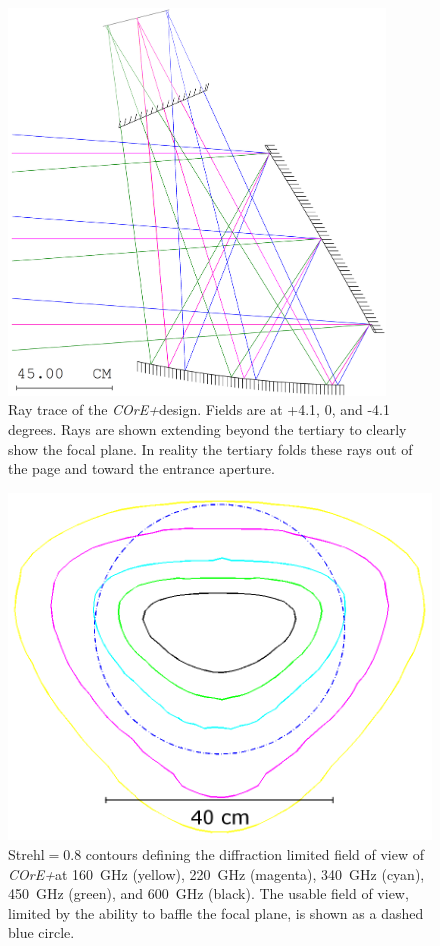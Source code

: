 \documentclass[11pt,a4paper]{article}
\newcommand{\coreplus}{\textit{\negthinspace COrE+\/}}
\begin{document}
\begin{figure}[htbp] %
	\centering
	\includegraphics[width=10cm]{xdragone_raytrace.png} 
	\caption{Ray trace of the \coreplus design. Fields are at +4.1, 0, and -4.1 degrees. Rays are shown extending beyond the tertiary 
		to clearly show the focal plane.  In reality the tertiary folds these rays out of the page and toward the entrance 
		aperture.  
	}
	\label{fig:raytrace_xdragone}
\end{figure}

\begin{figure}[htbp] %
	\centering
	\includegraphics[width=12cm]{core_xdragone_strehl.png} 
	\caption{Strehl$=0.8$ contours defining the diffraction limited field of view of \coreplus at 
                 160~GHz (yellow), 220~GHz (magenta), 340~GHz (cyan), 450~GHz (green), and 600~GHz (black). 
		The usable field of view, limited by the ability to baffle the focal plane, is shown as a 
                dashed blue circle.
		}
	\label{fig:strehl_xdragone}
\end{figure}
\end{document}
